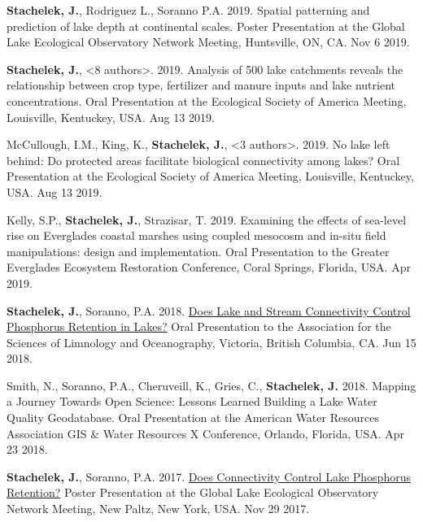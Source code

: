 \documentclass[11pt]{article}
\makeatletter
\newlength{\bibhang}
\newlength{\bibsep}
 {\@listi \global\bibsep\itemsep \global\advance\bibsep by\parsep}
\newenvironment{bibenum*}
  {\renewcommand\labelenumi{[\theenumi]}%
   \etaremune[
     topsep=0pt,
     itemsep=\bibsep,
     parsep=0pt,partopsep=0pt,
     itemindent=-\bibhang,
     leftmargin={\bibhang+\widthof{[999]}}]}
  {\endetaremune}
\makeatother
\begin{document}
\begin{bibenum*}

\item \textbf{Stachelek, J.}, Rodriguez L., Soranno P.A. 2019. Spatial patterning and prediction of lake depth at continental scales. Poster Presentation at the Global Lake Ecological Observatory Network Meeting, Huntsville, ON, CA. Nov 6 2019.

\item \textbf{Stachelek, J.}, <8 authors>. 2019. Analysis of 500 lake catchments reveals the relationship between crop type, fertilizer and manure inputs and lake nutrient concentrations. Oral Presentation at the Ecological Society of America Meeting, Louisville, Kentuckey, USA. Aug 13 2019.

\item McCullough, I.M., King, K., \textbf{Stachelek, J.}, <3 authors>. 2019. No lake left behind: Do protected areas facilitate biological connectivity among lakes? Oral Presentation at the Ecological Society of America Meeting, Louisville, Kentuckey, USA. Aug 13 2019.

\item Kelly, S.P., \textbf{Stachelek, J.}, Strazisar, T. 2019. Examining the effects of sea-level rise on Everglades coastal marshes using coupled mesocosm and in-situ field manipulations: design and implementation. Oral Presentation to the Greater Everglades Ecosystem Restoration Conference, Coral Springs, Florida, USA. Apr 2019.

  \item \textbf{Stachelek, J.}, Soranno, P.A. 2018. \href{https://doi.org/10.6084/m9.figshare.5903875.v2}{Does Lake and Stream Connectivity Control Phosphorus Retention in Lakes?} Oral Presentation to the Association for the Sciences of Limnology and Oceanography, Victoria, British Columbia, CA. Jun 15 2018.

  \item Smith, N., Soranno, P.A., Cheruveill, K., Gries, C., \textbf{Stachelek, J.} 2018. Mapping a Journey Towards Open Science: Lessons Learned Building a Lake Water Quality Geodatabase. Oral Presentation at the American Water Resources Association GIS & Water Resources X Conference, Orlando, Florida, USA. Apr 23 2018.

  \item \textbf{Stachelek, J.}, Soranno, P.A. 2017. \href{https://doi.org/10.6084/m9.figshare.9638735.v1}{Does Connectivity Control Lake Phosphorus Retention?} Poster Presentation at the Global Lake Ecological Observatory Network Meeting, New Paltz, New York, USA. Nov 29 2017.


\end{bibenum*}
\end{document}
